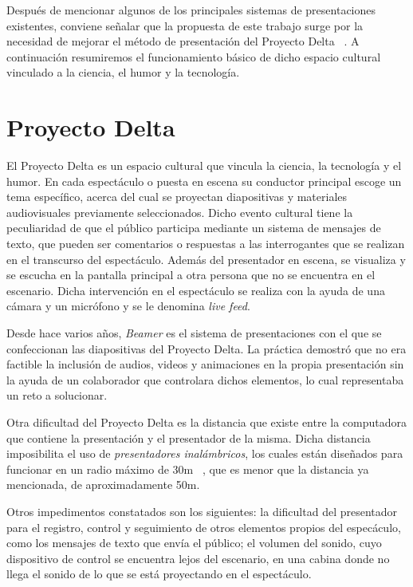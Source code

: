 
		Después de mencionar algunos de los principales sistemas de presentaciones existentes, conviene señalar que la propuesta de este trabajo surge por la necesidad de mejorar el método de presentación del Proyecto Delta ~\cite{delta}. A continuación resumiremos el funcionamiento básico de dicho espacio cultural vinculado a la ciencia, el humor y la tecnología.

	\section{Proyecto Delta} %
	\label{sec:proyecto_delta}

			El Proyecto Delta es un espacio cultural que vincula la ciencia, la tecnología y el humor. En cada espectáculo o puesta en escena su conductor principal escoge un tema específico, acerca del cual se proyectan diapositivas y materiales audiovisuales previamente seleccionados. Dicho evento cultural tiene la peculiaridad de que el público participa mediante un sistema de mensajes de texto, que pueden ser comentarios o respuestas a las interrogantes que se realizan en el transcurso del espectáculo. Además del presentador en escena, se visualiza y se escucha en la pantalla principal a otra persona que no se encuentra en el escenario. Dicha intervención en el espectáculo se realiza con la ayuda de una cámara y un micrófono y se le denomina \textit{live feed}.


			Desde hace varios años, \textit{Beamer} es el sistema de presentaciones con el que se confeccionan las diapositivas del Proyecto Delta. La práctica demostró que no era factible la inclusión de audios, videos y animaciones en la propia presentación sin la ayuda de un colaborador que controlara dichos elementos, lo cual representaba un reto a solucionar.	


			Otra dificultad del Proyecto Delta es la distancia que existe entre la computadora que contiene la presentación y el presentador de la misma. Dicha distancia imposibilita el uso de \textit{presentadores inalámbricos}, los cuales están diseñados para funcionar en un radio máximo de 30m ~\cite{tikitiki}, que es menor que la distancia ya mencionada, de aproximadamente 50m.

			Otros impedimentos constatados son los siguientes: la dificultad del presentador para el registro, control y seguimiento de otros elementos propios del especáculo, como los mensajes de texto que envía el público; el volumen del sonido, cuyo dispositivo de control se encuentra lejos del escenario, en una cabina donde no llega el sonido de lo que se está proyectando en el espectáculo.

